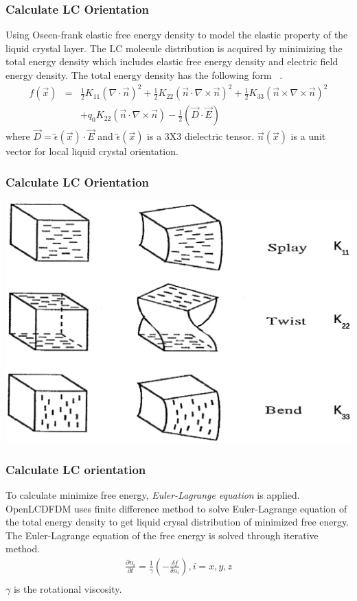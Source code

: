 \documentclass{beamer}
\begin{document}
\begin{frame}
\frametitle{Calculate LC Orientation}
Using Oseen-frank elastic free energy density to model the elastic property of the liquid crystal layer.
The LC molecule distribution is acquired by minimizing the total energy density which includes elastic free energy density and electric field energy density.
The total energy density has the following form ~\cite{ShinTson}.
\begin{eqnarray}
f(\vec x) &=& \frac{1}{2}K_{11}(\nabla\cdot\vec n)^2+\frac{1}{2}K_{22}(\vec n\cdot\nabla\times\vec n)^2 + \frac{1}{2}K_{33}(\vec n\times\nabla\times\vec n)^2\nonumber \\
&&+q_0K_{22}(\vec n\cdot\nabla\times\vec n) - \frac{1}{2}(\vec D\cdot\vec E)\nonumber
\label{eq:free_energy}
\end{eqnarray}
where $\vec D = \overleftrightarrow{\epsilon}(\vec x)\cdot \vec E$ and $\overleftrightarrow{\epsilon}(\vec x)$ is a 3X3 dielectric tensor. $\vec n(\vec{x})$ is a unit vector for local liquid crystal orientation.
\end{frame}
\begin{frame}[label=k_constants_graph]
\frametitle{Calculate LC Orientation}
\begin{center}
\includegraphics[scale=0.3]{lc_k_const.eps}
\end{center}
\end{frame}
\begin{frame}
\frametitle{Calculate LC orientation}
To calculate minimize free energy, \emph{Euler-Lagrange equation} is applied. OpenLCDFDM uses finite difference method to solve Euler-Lagrange equation of the total energy density to get liquid crysal distribution of minimized free energy.\\
The Euler-Lagrange equation of the free energy is solved through iterative method.
\begin{eqnarray}
\frac{\partial n_i}{\partial t} = \frac{1}{\gamma} \left( -\frac{\delta f}{\delta n_i} \right), i = x, y, z \\ \nonumber
\end{eqnarray}
$\gamma$ is the rotational viscosity.
\end{frame}
\end{document}
